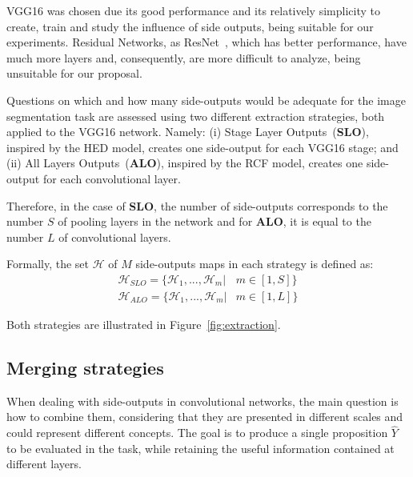 VGG16 was chosen due its good performance and its relatively simplicity to create, train and study the influence of side outputs, being suitable for our experiments. Residual Networks, as ResNet~\cite{He2016}, which has better performance, have much more layers and, consequently, are more difficult to analyze, being unsuitable for our proposal.

Questions on which and how many side-outputs would be adequate for the image segmentation task are assessed using two different extraction strategies, both applied to the VGG16 network. Namely: (i) Stage Layer Outputs~(\textbf{SLO}), inspired by the HED model, creates one side-output for each VGG16 stage; and (ii) All Layers Outputs~(\textbf{ALO}), inspired by the RCF model, creates one side-output for each convolutional layer. 

Therefore, in the case of \textbf{SLO}, the number of side-outputs corresponds to the number $S$ of pooling layers in the network and for \textbf{ALO}, it is equal to the number $L$ of convolutional layers.

Formally, the set $\mathcal{H}$ of $M$ side-outputs maps in each strategy is defined as:
\small
\begin{align}
\mathcal{H}_{SLO}=\{\mathcal{H}_1,...,\mathcal{H}_m|& m\in[1,S]\}\\
\mathcal{H}_{ALO}=\{\mathcal{H}_1,...,\mathcal{H}_m|& m\in[1,L]\}
\end{align}
\normalsize


Both strategies are illustrated in Figure~\ref{fig:extraction}.



\subsection{Merging strategies}
\label{ssec:mergin_strategies}

When dealing with side-outputs in convolutional networks, the main question is how to combine them, considering that they are presented in different scales and could represent different concepts. The goal is to produce a single proposition $\hat{Y}$ to be evaluated in the task, while retaining the useful information contained at different layers.

